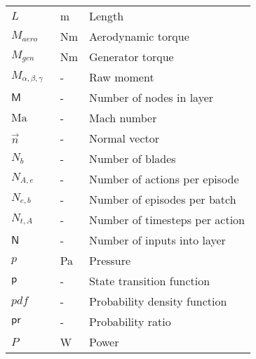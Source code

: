 \begin{longtable}{p{5cm}p{4cm}p{5cm}}
    $L$						& \SI{}{m}		& Length \\
    $M_{aero}$				& \SI{}{Nm}		& Aerodynamic torque \\
    $M_{gen}$				& \SI{}{Nm}		& Generator torque \\
    $M_{\alpha, \beta, \gamma}$	& \SI{}{-}	& Raw moment \\
    $\mathsf{M}$			& \SI{}{-}		& Number of nodes in layer \\
    $\mathrm{Ma}$			& \SI{}{-}		& Mach number \\
    $\vec{n}$ 				& \SI{}{-}		& Normal vector \\
    $N_b$					& \SI{}{-}		& Number of blades \\
    $N_{A,e}$				& \SI{}{-}		& Number of actions per episode \\
    $N_{e,b}$				& \SI{}{-}		& Number of episodes per batch \\
    $N_{t,A}$				& \SI{}{-}		& Number of timesteps per action \\
    $\mathsf{N}$			& \SI{}{-}		& Number of inputs into layer \\
    $p$                     & \SI{}{Pa}     & Pressure \\
    $\mathsf{p}$			& \SI{}{-}		& State transition function \\
    $pdf$					& \SI{}{-}		& Probability density function \\
    $\mathsf{pr}$			& \SI{}{-}		& Probability ratio \\
    $P$						& \SI{}{W}		& Power \\

\end{longtable}
